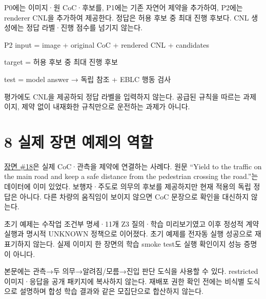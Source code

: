 \documentclass[11pt,a4paper]{article}
\begin{document}
P0에는 이미지·원 CoC·후보를, P1에는 기존 자연어 제약을 추가하여, P2에는 renderer CNL을 추가하여 제공한다. 정답은 허용 후보 중 최대 진행 후보다. CNL 생성에는 정답 라벨·진행 점수를 넘기지 않는다.\par

\begingroup\small\ttfamily\setlength{\parskip}{1pt}
\noindent\hspace*{0.0em}P2 input = image + original CoC + rendered CNL + candidates\par
\noindent\hspace*{0.0em}target   = 허용 후보 중 최대 진행 후보\par
\noindent\hspace*{0.0em}test     = model answer → 독립 참조 + EBLC 행동 검사\par\endgroup\par

평가에도 CNL을 제공하되 정답 라벨을 입력하지 않는다. 공급된 규칙을 따르는 과제이지, 제약 없이 내재화한 규칙만으로 운전하는 과제가 아니다.\par

\clearpage{}\section*{8 실제 장면 예제의 역할}

\href{\detokenize{../../../../../../projects/04-guardsynth-coc/paper/examples/SCENE18_PIPELINE_EXAMPLE_REPORT_V01.md}}{장면 \#18}은 실제 CoC·관측을 제약에 연결하는 사례다. 원문 “Yield to the traffic on the main road and keep a safe distance from the pedestrian crossing the road.”는 데이터에 이미 있었다. 보행자·주도로 의무의 후보를 제공하지만 현재 적용의 독립 정답은 아니다. 다른 차량의 움직임이 보이지 않으면 CoC 문장으로 확인을 대신하지 않는다.\par

초기 예제는 수작업 조건부 명세·11개 Z3 질의·학습 미리보기였고 이후 정성적 계약 실행과 명시적 UNKNOWN 정책으로 이어졌다. 초기 예제를 전자동 실행 성공으로 재표기하지 않는다. 실제 이미지 한 장면의 학습 smoke test도 실행 확인이지 성능 증명이 아니다.\par

본문에는 관측→두 의무→알려짐/모름→진입 판단 도식을 사용할 수 있다. restricted 이미지·응답을 공개 패키지에 복사하지 않는다. 재배포 권한 확인 전에는 비식별 도식으로 설명하며 합성 학습 결과와 같은 모집단으로 합산하지 않는다.\par
\end{document}
